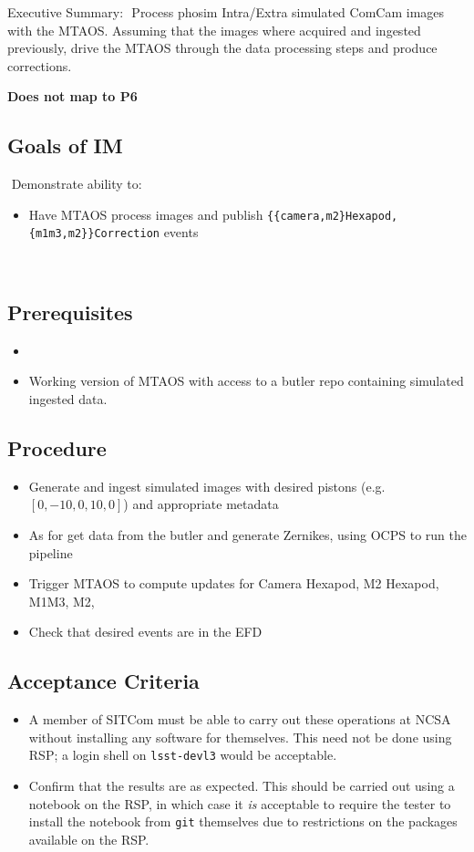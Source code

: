 
Executive Summary:
​
Process phosim Intra/Extra simulated ComCam images with the MTAOS.
Assuming that the images where acquired and ingested previously, drive the MTAOS through the data processing steps and produce corrections.

\textbf{Does not map to P6}
​
\subsection{Goals of IM}
​
Demonstrate ability to:
​
\begin{itemize}
\item Have MTAOS process images and publish
  \texttt{\{\{camera,m2\}Hexapod,\{m1m3,m2\}\}Correction} events
\end{itemize}
​
\subsection{Prerequisites}
\begin{itemize}
\item {}
\item Working version of MTAOS with access to a butler repo containing simulated ingested data.
\end{itemize}

\subsection{Procedure}
\begin{itemize}
\item Generate and ingest simulated images with desired pistons (e.g. $[0, -10, 0, 10, 0]$) and appropriate
  metadata
\item As for  get data from the butler and generate Zernikes, using OCPS to run the pipeline
\item Trigger MTAOS to compute updates for Camera Hexapod, M2 Hexapod, M1M3, M2, 
\item Check that desired events are in the EFD
\end{itemize}

\subsection{Acceptance Criteria}
\begin{itemize}
\item A member of SITCom must be able to carry out these operations at NCSA without installing any
  software for themselves.  This need not be done using RSP; a login shell on \eg \texttt{lsst-devl3}
  would be acceptable.
\item Confirm that the results are as expected.  This should be carried out using a notebook on the RSP,
  in which case it \textit{is} acceptable to require the tester to install the notebook from \texttt{git}
  themselves due to restrictions on the packages available on the RSP.
\end{itemize}

